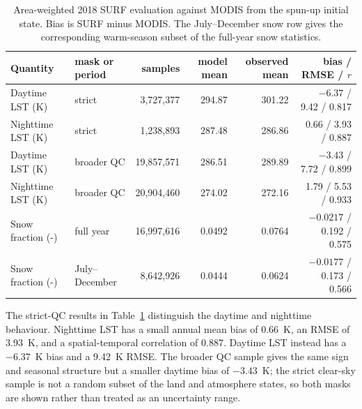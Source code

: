 \begin{table}[H]
\caption{Area-weighted 2018 SURF evaluation against MODIS from the spun-up
initial state. Bias is SURF minus MODIS. The July--December snow row gives
the corresponding warm-season subset of the full-year snow statistics.}
\label{tab:modis-validation}
\centering
\small
\begin{tabular}{llrrrr}
\hline
Quantity & mask or period & samples & model mean & observed mean & bias / RMSE / $r$ \\
\hline
Daytime LST (K) & strict & 3,727,377 & 294.87 & 301.22 & $-6.37$ / 9.42 / 0.817 \\
Nighttime LST (K) & strict & 1,238,893 & 287.48 & 286.86 & 0.66 / 3.93 / 0.887 \\
Daytime LST (K) & broader QC & 19,857,571 & 286.51 & 289.89 & $-3.43$ / 7.72 / 0.899 \\
Nighttime LST (K) & broader QC & 20,904,460 & 274.02 & 272.16 & 1.79 / 5.53 / 0.933 \\
Snow fraction (-) & full year & 16,997,616 & 0.0492 & 0.0764 & $-0.0217$ / 0.192 / 0.575 \\
Snow fraction (-) & July--December & 8,642,926 & 0.0444 & 0.0624 & $-0.0177$ / 0.173 / 0.566 \\
\hline
\end{tabular}
\end{table}

The strict-QC results in Table~\ref{tab:modis-validation} distinguish the
daytime and nighttime behaviour. Nighttime LST has a small annual mean bias
of 0.66~K, an RMSE of 3.93~K, and a spatial-temporal correlation of 0.887.
Daytime LST instead has a $-6.37$~K bias and a 9.42~K RMSE. The broader QC
sample gives the same sign and seasonal structure but a smaller daytime bias
of $-3.43$~K; the strict clear-sky sample is not a random subset of the land
and atmosphere states, so both masks are shown rather than treated as an
uncertainty range.

